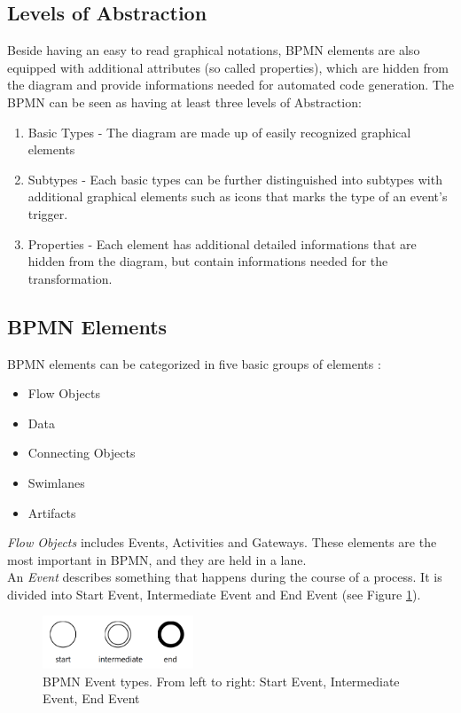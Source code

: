 \subsection{Levels of Abstraction}
Beside having an easy to read graphical notations, BPMN elements are also equipped with additional attributes (so called properties), which are hidden from the diagram and provide informations needed for automated code generation. The BPMN can be seen as having at least three levels of Abstraction:
\begin{enumerate}
	\item Basic Types - The diagram are made up of easily recognized graphical elements
	\item Subtypes - Each basic types can be further distinguished into subtypes with additional graphical elements such as icons that marks the type of an event's trigger.
	\item Properties - Each element has additional detailed informations that are hidden from the diagram, but contain informations needed for the transformation.
\end{enumerate}


\subsection{BPMN Elements}
BPMN elements can be categorized in five basic groups of elements\cite{BPMN2} :
\begin{itemize}
	\item Flow Objects
	\item Data
	\item Connecting Objects
	\item Swimlanes
	\item Artifacts
\end{itemize}
\textit{Flow Objects} includes Events, Activities and Gateways. These elements are the most important in BPMN, and they are held in a lane.\\

An \textit{Event} describes something that happens during the course of a process. It is divided into Start Event, Intermediate Event and End Event (see Figure \ref{fig:events}).\\
\begin{figure}[h]
	\centering
	\includegraphics[width=0.4\textwidth]{images/events.png}
	\caption{BPMN Event types. From left to right: Start Event, Intermediate Event, End Event}
	\label{fig:events}
\end{figure}

